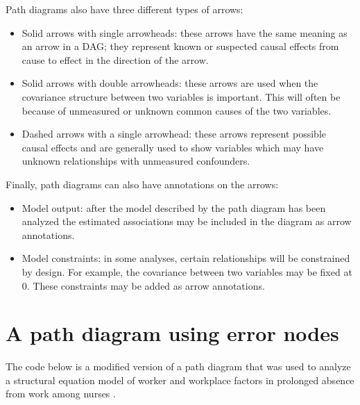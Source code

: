 \documentclass[a4paper]{report}
\begin{document}
\vspace{2em}
Path diagrams also have three different types of arrows:
\begin{itemize}
    \item Solid arrows with single arrowheads: these arrows have the same meaning as an arrow in a DAG; they represent known or suspected causal effects from cause to effect in the direction of the arrow. 
    \item Solid arrows with double arrowheads: these arrows are used when the covariance structure between two variables is important. This will often be because of unmeasured or unknown common causes of the two variables.
    \item Dashed arrows with a single arrowhead: these arrows represent possible causal effects and are generally used to show variables which may have unknown relationships with unmeasured confounders.
\end{itemize}

\vspace{2em}
Finally, path diagrams can also have annotations on the arrows:
\begin{itemize}
    \item Model output: after the model described by the path diagram has been analyzed the estimated associations may be included in the diagram as arrow annotations.
    \item Model constraints: in some analyses, certain relationships will be constrained by design. For example, the covariance between two variables may be fixed at 0. These constraints may be added as arrow annotations.
\end{itemize}

\section{A path diagram using error nodes}
The code below is a modified version of a path diagram that was used to analyze a structural equation model of worker and workplace factors in prolonged absence from work among nurses \cite{franche2011examining}.
\end{document}
